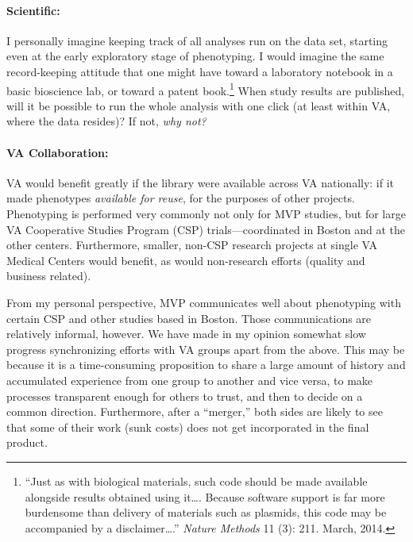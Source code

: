 \documentclass{tufte-handout}
\begin{document}
\paragraph{Scientific:}
I personally imagine keeping track of all analyses run on the data set,
starting even at the early exploratory stage of phenotyping. I would
imagine the same record-keeping attitude that one might have toward a
laboratory notebook in a basic bioscience lab, or toward a patent
book.\footnote{``Just as with biological materials, such code should
  be made available alongside results obtained using it\ldots{}.
  Because software support is far more burdensome than delivery of
  materials such as plasmids, this code may be accompanied by a
  disclaimer\ldots{}.'' \emph{Nature Methods} 11 (3): 211. March,
  2014.} When study results are published, will it be possible to run
the whole analysis with one click (at least within VA, where the data
resides)? If not, \emph{why not?}

\paragraph{VA Collaboration:}
VA would benefit greatly if the library were available across VA
nationally: if it made phenotypes \emph{available for reuse}, for the
purposes of other projects. Phenotyping is performed very commonly not
only for MVP studies, but for large VA Cooperative Studies Program (CSP)
trials---coordinated in Boston and at the other centers. Furthermore,
smaller, non-CSP research projects at single VA Medical Centers would
benefit, as would non-research efforts (quality and business related).

From my personal perspective, MVP communicates well about phenotyping
with certain CSP and other studies based in Boston. Those
communications are relatively informal, however. We have made in my
opinion somewhat slow progress synchronizing efforts with VA groups
apart from the above. This may be because it is a time-consuming
proposition to share a large amount of history and accumulated
experience from one group to another and vice versa, to make processes
transparent enough for others to trust, and then to decide on a common
direction. Furthermore, after a ``merger,'' both sides are likely to
see that some of their work (sunk costs) does not get incorporated in
the final product.
\end{document}
